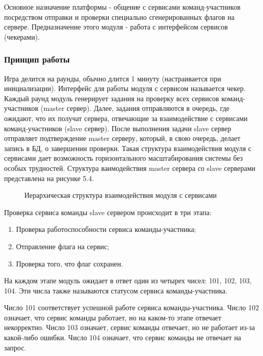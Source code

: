 Основное назначение платформы - общение с сервисами команд-участников посредством отправки и проверки специально сгенерированных флагов на сервере. Предназначение этого модуля - работа с интерфейсом сервисов (чекерами).

\subsubsection{Принцип работы}
Игра делится на раунды, обычно длится 1 минуту (настраивается при инициализации). Интерфейс для работы модуля с сервисом называется чекер. Каждый раунд модуль генерирует задания на проверку всех сервисов команд-участников (master сервер). Далее, задания отправляются в очередь, где ожидают, что их получат сервера, отвечающие за взаимодействие с сервисами команд-участников (slave сервер). После выполнения задачи slave сервер отправляет подтверждение master серверу, который, в свою очередь, делает запись в БД, о завершении проверки. Такая структура взаимодействия модуля с сервисами дает возможность горизонтального масштабирования системы без особых трудностей. Структура ваимодействия master сервера со slave серверами представлена на рисунке 5.4.

\begin{figure}[ht!]
\caption{Иерархическая структура взаимодействия модуля с сервисами}
\end{figure}

Проверка сервиса команды slave сервером происходит в три этапа:
\begin{enumerate} 
\item Проверка работоспособности сервиса команды-участника;
\item Отправление флага на сервис; 
\item Проверка того, что флаг сохранен.
\end{enumerate}

На каждом этапе модуль ожидает в ответ один из четырех чисел: 101, 102, 103, 104. Эти числа также называются статусом сервиса команды-участника. 



Число 101 соответствует успешной работе сервиса команды-участника. Число 102 означает, что сервис команды работает, но на каком-то этапе отвечает некорректно. Число 103 означает, сервис команды отвечает, но не работает из-за какой-либо ошибки. Число 104 означает, что сервис команды не отвечает на запрос. 

